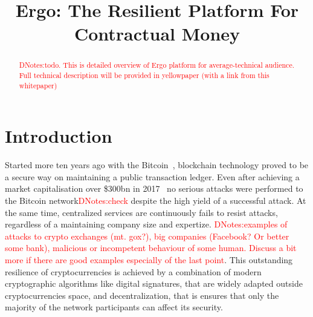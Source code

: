 \documentclass[]{article}
\newcommand{\dnote}[1]{{\textcolor{red}{DNotes:{#1}}}}
\begin{document}
    \title{Ergo: The Resilient Platform For Contractual Money}


    \maketitle

    \begin{abstract}
        \dnote{todo. This is detailed overview of Ergo platform for average-technical audience. Full technical description will be provided in yellowpaper (with a link from this whitepaper)}
    \end{abstract}



    \section{Introduction}


    Started more ten years ago with the Bitcoin~\cite{nakamoto2008bitcoin}, blockchain technology proved to be a secure way on maintaining
    a public transaction ledger.
    Even after achieving a market capitalisation over \$300bn in 2017~\cite{btcPrice}
    no serious attacks were performed to the Bitcoin network\dnote{check} despite the high yield of a successful attack.
    At the same time, centralized services are continuously fails to resist attacks, regardless of a maintaining company size and expertize.
    \dnote{examples of attacks to crypto exchanges (mt. gox?), big companies (Facebook? Or better some bank), malicious or incompetent behaviour of some human.
    Discuss a bit more if there are good examples especially of the last point}.
    This outstanding resilience of cryptocurrencies is achieved by a combination of modern cryptographic algorithms like digital
    signatures, that are widely adapted outside cryptocurrencies space, and decentralization, that is ensures that only
    the majority of the network participants can affect its security.
\end{document}
